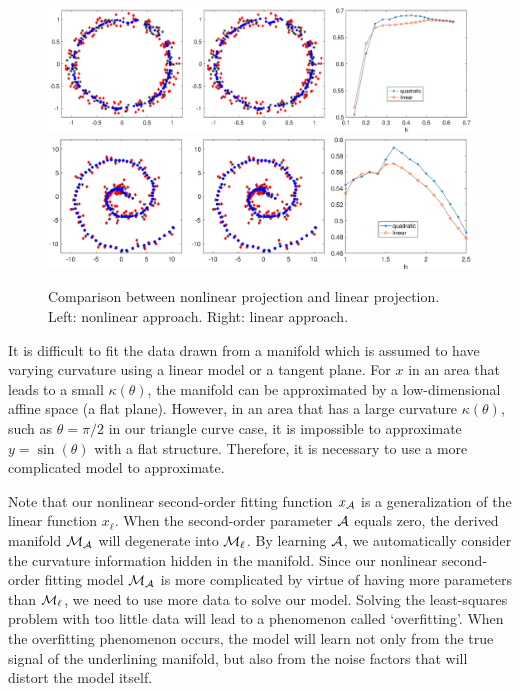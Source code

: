 \documentclass{article}
\theoremstyle{remark}
\begin{document}
\begin{figure}[H] %
   \centering
    \includegraphics[width=\linewidth]{circle_result.eps} 
     \includegraphics[width=\linewidth]{swiss_roll.eps} 
     \vspace{-0.4cm}
   \caption{Comparison between nonlinear projection and linear projection. Left: nonlinear approach. Right: linear approach.}
   \label{fig:sin_curve}
\end{figure}

It is difficult to fit the data drawn from a manifold which is assumed to have varying curvature using a linear model or a tangent plane. For $x$ in an area that leads to a small $\kappa(\theta)$, the manifold can be approximated by a low-dimensional affine space (a flat plane). However, in an area that has a large curvature $\kappa(\theta)$, such as $\theta=\pi/2$ in our triangle curve case, it is impossible to approximate $y = \sin(\theta)$ with a flat structure. Therefore, it is necessary to use a more complicated model to approximate. 

Note that our nonlinear second-order fitting function $x_{\cal A}$ is a generalization of the linear function $x_\ell$. When the second-order parameter $\cal A$ equals zero, the derived manifold $\cal M_A$ will degenerate into ${\cal M}_\ell$. By learning $\cal A$, we automatically consider the curvature information hidden in the manifold. Since our nonlinear second-order fitting model $\cal M_A$ is more complicated by virtue of  having more parameters than  ${\cal M}_\ell$, we need to use more data to solve our model. Solving the least-squares problem with too little data will lead to a phenomenon called `overfitting'. When the overfitting phenomenon occurs, the model will learn not only from the true signal of the underlining manifold, but also from the noise factors that will distort the model itself.
\end{document}

